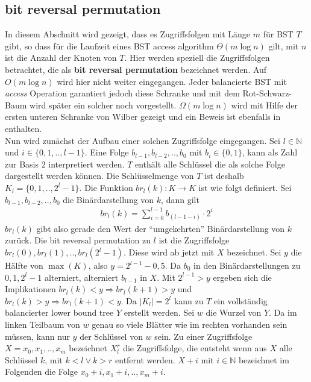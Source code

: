 \documentclass[a4paper,12pt]{article}
\begin{document}
\subsection{bit reversal permutation }
In diesem Abschnitt wird gezeigt, dass es Zugriffsfolgen mit Länge $m$ für BST $T$ gibt, so dass für die Laufzeit eines BST access algorithm $\Theta\left(m \log n\right)$ gilt, mit $n$ ist die Anzahl der Knoten von $T$. Hier werden speziell die Zugriffsfolgen betrachtet, die als \textbf{bit reversal permutation} bezeichnet werden. Auf $O\left(m \log n\right)$ wird hier nicht weiter eingegangen. Jeder balancierte BST mit \textit{access} Operation garantiert jedoch diese Schranke und mit dem Rot-Schwarz-Baum wird später ein solcher noch vorgestellt.
 $\Omega\left(m \log n\right)$  wird mit Hilfe der ersten unteren Schranke von Wilber gezeigt und ein Beweis ist ebenfalls in \cite{wilberLowerBounds} enthalten. \\
  Nun wird zunächst der Aufbau einer solchen Zugriffsfolge eingegangen. Sei $l \in \mathbb{N}$ und $i \in \{0,1,..,l-1\}$. Eine Folge  $b_{l-1},b_{l-2},..,b_0$ mit $b_i \in \{0,1\}$, kann als Zahl zur Basis $2$ interpretiert werden. $T$ enthält alle Schlüssel die als solche Folge dargestellt werden können. Die Schlüsselmenge von $T$ ist deshalb $K_l = \{0,1,..,2^l -1\}$. 
  Die Funktion $\mathit{br}_l(k)\colon K \rightarrow K$ ist wie folgt definiert. Sei {$b_{l-1},b_{l-2},..,b_{0}$} die Binärdarstellung von $k$, dann gilt 
\begin{align*}
\mathit{br}_l(k) = \sum_{i = 0}^{l-1} b_{\left(l-1-i\right)} \cdot 2^i
\end{align*}
 $\mathit{br}_l(k)$ gibt also gerade den Wert der \enquote{umgekehrten} Binärdarstellung von $k$ zurück. Die bit reversal permutation zu $l$ ist die Zugriffsfolge\\ ${\mathit{br}_l(0),\mathit{br}_l(1),..,\mathit{br}_l(2^l-1)}$. Diese wird ab jetzt mit $X$ bezeichnet. Sei $y$ die Hälfte von $\max\left(K\right)$, also $y = 2^{l-1} - 0,5$. Da $b_0$ in den Binärdarstellungen zu $0, 1, 2^l-1$ alterniert, alterniert $b_{l-1}$ in $X$. Mit $2^{l-1} > y$ ergeben sich die Implikationen $\mathit{br}_l(k) < y \Rightarrow \mathit{br}_l(k +1) > y$ und $\mathit{br}_l(k) > y \Rightarrow \mathit{br}_l(k +1) < y$. Da $\vert K_l \vert = 2^l$ kann zu $T$ ein vollständig balancierter lower bound tree $Y$ erstellt werden. Sei $w$ die Wurzel von $Y$. Da im linken Teilbaum von $w$ genau so viele Blätter wie im rechten vorhanden sein müssen, kann nur $y$ der Schlüssel von $w$ sein. Zu einer Zugriffsfolge $X = x_0,x_1,..,x_m$ bezeichnet $X^r_l$ die Zugriffsfolge, die entsteht wenn aus $X$ alle Schlüssel $k$, mit $k < l \lor k > r$ entfernt werden. $X + i$ mit $i \in \mathbb{N}$ bezeichnet im Folgenden die Folge $x_0 + i, x_1 + i,.., x_m + i$.
  
\end{document}

